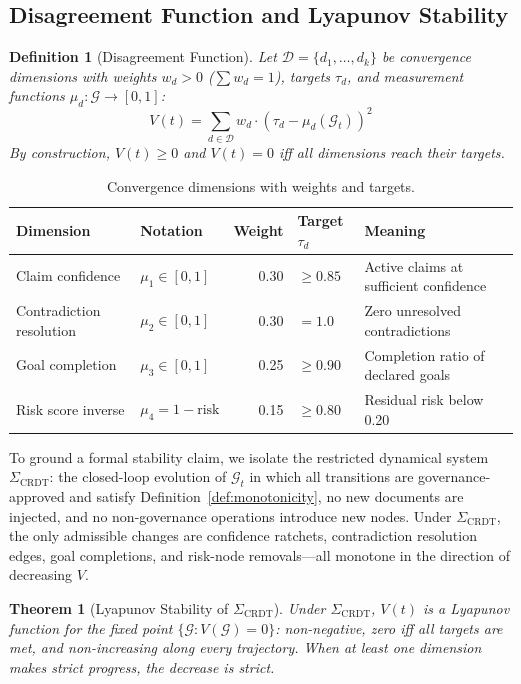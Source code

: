 \documentclass[11pt]{article}
\newtheorem{definition}{Definition}
\newtheorem{theorem}{Theorem}
\begin{document}
\subsection{Disagreement Function and Lyapunov Stability}

\begin{definition}[Disagreement Function]
\label{def:lyapunov}
Let $\mathcal{D} = \{d_1, \ldots, d_k\}$ be convergence dimensions with weights $w_d > 0$ ($\sum w_d = 1$), targets $\tau_d$, and measurement functions $\mu_d : \mathcal{G} \to [0,1]$:
\[
V(t) = \sum_{d \in \mathcal{D}} w_d \cdot (\tau_d - \mu_d(\mathcal{G}_t))^2
\]
By construction, $V(t) \geq 0$ and $V(t) = 0$ iff all dimensions reach their targets.
\end{definition}

\begin{table}[H]
\centering
\small
\begin{tabular}{llrll}
\toprule
\textbf{Dimension} & \textbf{Notation} & \textbf{Weight} & \textbf{Target $\tau_d$} & \textbf{Meaning} \\
\midrule
Claim confidence & $\mu_1 \in [0,1]$ & 0.30 & $\geq 0.85$ & Active claims at sufficient confidence \\
Contradiction resolution & $\mu_2 \in [0,1]$ & 0.30 & $= 1.0$ & Zero unresolved contradictions \\
Goal completion & $\mu_3 \in [0,1]$ & 0.25 & $\geq 0.90$ & Completion ratio of declared goals \\
Risk score inverse & $\mu_4 = 1{-}\mathrm{risk}$ & 0.15 & $\geq 0.80$ & Residual risk below 0.20 \\
\bottomrule
\end{tabular}
\caption{Convergence dimensions with weights and targets.}
\label{tab:dimensions}
\end{table}

To ground a formal stability claim, we isolate the restricted dynamical system $\Sigma_{\mathrm{CRDT}}$: the closed-loop evolution of $\mathcal{G}_t$ in which all transitions are governance-approved and satisfy Definition~\ref{def:monotonicity}, no new documents are injected, and no non-governance operations introduce new nodes.
Under $\Sigma_{\mathrm{CRDT}}$, the only admissible changes are confidence ratchets, contradiction resolution edges, goal completions, and risk-node removals---all monotone in the direction of decreasing $V$.

\begin{theorem}[Lyapunov Stability of $\Sigma_{\mathrm{CRDT}}$]
\label{thm:lyapunov}
Under $\Sigma_{\mathrm{CRDT}}$, $V(t)$ is a Lyapunov function for the fixed point $\{\mathcal{G} : V(\mathcal{G}) = 0\}$: non-negative, zero iff all targets are met, and non-increasing along every trajectory.
When at least one dimension makes strict progress, the decrease is strict.
\end{theorem}
\end{document}
